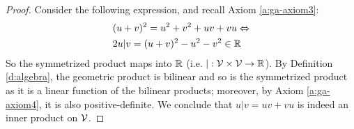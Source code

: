 \begin{proof}
	Consider the following expression, and recall Axiom \ref{a:ga-axiom3}:
    \begin{align*}
        &(u+v)^2 = u^2 + v^2 + uv + vu \Leftrightarrow \\
        &2u|v = (u+v)^2 - u^2 - v^2 \in \mathbb{R}
    \end{align*}
	So the symmetrized product maps into $\mathbb{R}$ (i.e. $| : \mathcal{V} \times \mathcal{V} \to \mathbb{R}$). By Definition \ref{d:algebra}, the geometric product is bilinear and so is the symmetrized product as it is a linear function of the bilinear products; moreover, by Axiom \ref{a:ga-axiom4}, it is also positive-definite. We conclude that $u|v = uv + vu$ is indeed an inner product on $\mathcal{V}$.
	
\end{proof}

